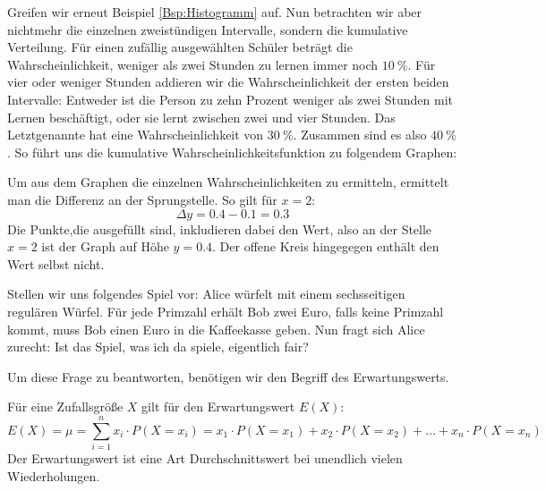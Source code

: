 \documentclass[ngerman, 12pt]{nssheetxea}
\begin{document}
\begin{example}
Greifen wir erneut Beispiel \ref{Bsp:Histogramm} auf. Nun betrachten wir aber nichtmehr die einzelnen zweistündigen Intervalle, sondern die kumulative Verteilung. Für einen zufällig ausgewählten Schüler beträgt die Wahrscheinlichkeit, weniger als zwei Stunden zu lernen immer noch $\SI{10}{\percent}$. Für vier oder weniger Stunden addieren wir die Wahrscheinlichkeit der ersten beiden Intervalle: Entweder ist die Person zu zehn Prozent weniger als zwei Stunden mit Lernen beschäftigt, oder sie lernt zwischen zwei und vier Stunden. Das Letztgenannte hat eine Wahrscheinlichkeit von $\SI{30}{\percent}$. Zusammen sind es also $\SI{40}{\percent}$. So führt uns die kumulative Wahrscheinlichkeitsfunktion zu folgendem Graphen:

\begin{center}
\end{center}
Um aus dem Graphen die einzelnen Wahrscheinlichkeiten zu ermitteln, ermittelt man die Differenz an der Sprungstelle. So gilt für $x=2$:
\[ \Delta y = \num{0,4}-\num{0,1} = \num{0,3}\]
Die Punkte,die ausgefüllt sind, inkludieren dabei den Wert, also an der Stelle $x=2$ ist der Graph auf Höhe $y=\num{0,4}$. Der offene Kreis hingegegen enthält den Wert selbst nicht. 
\end{example}

Stellen wir uns folgendes Spiel vor: Alice würfelt mit einem sechsseitigen regulären Würfel. Für jede Primzahl erhält Bob zwei Euro, falls keine Primzahl kommt, muss Bob einen Euro in die Kaffeekasse geben. Nun fragt sich Alice zurecht: \glqq Ist das Spiel, was ich da spiele, eigentlich fair?\grqq \par
Um diese Frage zu beantworten, benötigen wir den Begriff des Erwartungswerts.
\begin{definition}
Für eine Zufallsgröße $X$ gilt für den Erwartungswert $E(X)$:
\[ E(X) = \mu = \sum_{i=1}^nx_i \cdot P(X=x_i) = x_1 \cdot P(X=x_1) + x_2 \cdot P(X=x_2) + \ldots + x_n \cdot P(X=x_n) \]
Der Erwartungswert ist eine Art Durchschnittswert bei unendlich vielen Wiederholungen.
\end{definition}
\end{document}
